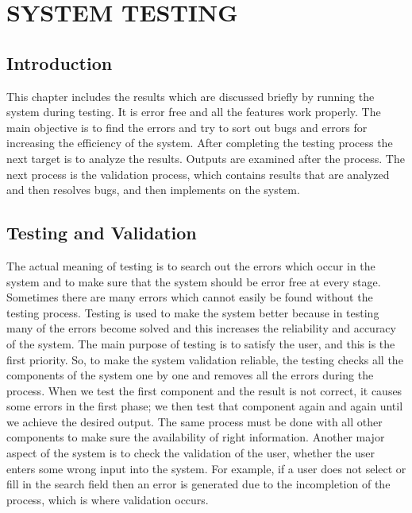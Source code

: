 \chapter{SYSTEM TESTING}

\section{Introduction}

This chapter includes the results which are discussed briefly by running the system during testing. It is error free and all the features work properly. The main objective is to find the errors and try to sort out bugs and errors for increasing the efficiency of the system. After completing the testing process the next target is to analyze the results. Outputs are examined after the process. The next process is the validation process, which contains results that are analyzed and then resolves bugs, and then implements on the system.

\section{Testing and Validation}

The actual meaning of testing is to search out the errors which occur in the system and to make sure that the system should be error free at every stage. Sometimes there are many errors which cannot easily be found without the testing process. Testing is used to make the system better because in testing many of the errors become solved and this increases the reliability and accuracy of the system. The main purpose of testing is to satisfy the user, and this is the first priority. So, to make the system validation reliable, the testing checks all the components of the system one by one and removes all the errors during the process. When we test the first component and the result is not correct, it causes some errors in the first phase; we then test that component again and again until we achieve the desired output. The same process must be done with all other components to make sure the availability of right information. Another major aspect of the system is to check the validation of the user, whether the user enters some wrong input into the system. For example, if a user does not select or fill in the search field then an error is generated due to the incompletion of the process, which is where validation occurs.

